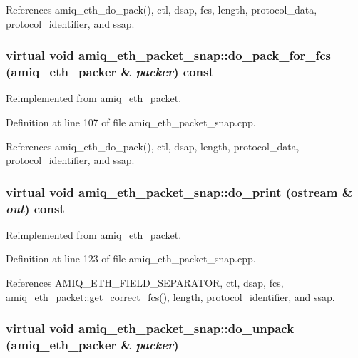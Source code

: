 References amiq\_\-eth\_\-do\_\-pack(), ctl, dsap, fcs, length, protocol\_\-data, protocol\_\-identifier, and ssap.\hypertarget{classamiq__eth__packet__snap_a042b049988a9e938cb80acb497cfafe5}{
\subsubsection[{do\_\-pack\_\-for\_\-fcs}]{\setlength{\rightskip}{0pt plus 5cm}virtual void amiq\_\-eth\_\-packet\_\-snap::do\_\-pack\_\-for\_\-fcs ({\bf amiq\_\-eth\_\-packer} \& {\em packer}) const}}
\label{classamiq__eth__packet__snap_a042b049988a9e938cb80acb497cfafe5}


Reimplemented from \hyperlink{classamiq__eth__packet_aacbc675df31e2674b5b4c73c9bd9961e}{amiq\_\-eth\_\-packet}.

Definition at line 107 of file amiq\_\-eth\_\-packet\_\-snap.cpp.

References amiq\_\-eth\_\-do\_\-pack(), ctl, dsap, length, protocol\_\-data, protocol\_\-identifier, and ssap.\hypertarget{classamiq__eth__packet__snap_af0ca9e38d460f39767d5abf60f48cee9}{
\subsubsection[{do\_\-print}]{\setlength{\rightskip}{0pt plus 5cm}virtual void amiq\_\-eth\_\-packet\_\-snap::do\_\-print (ostream \& {\em out}) const}}
\label{classamiq__eth__packet__snap_af0ca9e38d460f39767d5abf60f48cee9}


Reimplemented from \hyperlink{classamiq__eth__packet_aa179c700ae183f1b884a9222a73fed4e}{amiq\_\-eth\_\-packet}.

Definition at line 123 of file amiq\_\-eth\_\-packet\_\-snap.cpp.

References AMIQ\_\-ETH\_\-FIELD\_\-SEPARATOR, ctl, dsap, fcs, amiq\_\-eth\_\-packet::get\_\-correct\_\-fcs(), length, protocol\_\-identifier, and ssap.\hypertarget{classamiq__eth__packet__snap_a7bb9ce14ff76d5bacb715a53382a7816}{
\subsubsection[{do\_\-unpack}]{\setlength{\rightskip}{0pt plus 5cm}virtual void amiq\_\-eth\_\-packet\_\-snap::do\_\-unpack ({\bf amiq\_\-eth\_\-packer} \& {\em packer})}}
\label{classamiq__eth__packet__snap_a7bb9ce14ff76d5bacb715a53382a7816}


